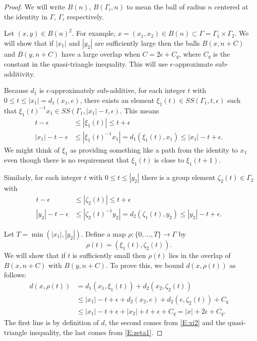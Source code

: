 \documentclass[12pt]{article}
\theoremstyle{plain}
\theoremstyle{definition}
\theoremstyle{remark}
\newcommand{\G}{\Gamma}
\newcommand{\eps}{\epsilon}
\begin{document}
\begin{proof}%
We will write $B(n)$, $B(\G_i,n)$ to mean the ball of radius $n$ centered at the identity in $\G$, $\G_i$ respectively. 

Let $(x,y) \in B(n)^2$. For example, $x=(x_1,x_2)\in B(n) \subset \G=\G_1\times \G_2$. We will show that if $|x_1|$ and $|y_2|$ are sufficiently large then the balls $B(x,n+C)$ and $B(y,n+C)$ have a large overlap when $C=2\eps+C_q$, where $C_q$ is the constant in the quasi-triangle inequality. This will use $\eps$-approximate sub-additivity. 


Because $d_1$ is $\eps$-approximately sub-additive, for each integer $t$ with $0\le t\le |x_1|=d_1(x_1,e)$, there exists an element $\xi_1(t) \in SS(\G_1,t,\eps)$ such that $\xi_1(t)^{-1}x_1 \in SS(\G_1,|x_1|-t,\eps)$. This means
\begin{align}
    t-\eps& \le |\xi_1(t)|\le t+\eps \label{E:xi1} \\
    |x_1|-t-\eps& \le |\xi_1(t)^{-1}x_1|=d_1(\xi_1(t),x_1)  \le |x_1|-t+\eps.\label{E:xi2} 
\end{align}
We might think of $\xi_1$ as providing something like a path from the identity to $x_1$ even though there is no requirement that $\xi_1(t)$ is close to $\xi_1(t+1)$. 

Similarly, for each integer $t$ with $0\le t \le |y_2|$ there is a group element $\zeta_2(t)\in \G_2$ with
\begin{align}
    t-\eps& \le |\zeta_2(t)|\le t+\eps \label{E:zeta1}\\
    |y_2|-t-\eps& \le |\zeta_2(t)^{-1}y_2|=d_2(\zeta_1(t),y_2)  \le |y_2|-t+\eps.\label{E:zeta2}
\end{align}




Let $T=\min(|x_1|,|y_2|)$. Define a map $\rho:\{0,\ldots, T\} \to \G$ by
$$\rho(t) = (\xi_1(t),\zeta_2(t)).$$
We will show that if $t$ is sufficiently small then $\rho(t)$ lies in the overlap of $B(x,n+C)$ with $B(y,n+C)$. To prove this, we bound $d(x,\rho(t))$ as follows:
\begin{align*}
  d(x,\rho(t))  &= d_1(x_1, \xi_1(t)) + d_2(x_2, \zeta_2(t))  \\
  &\le |x_1|-t+\eps + d_2(x_2, e) + d_2(e, \zeta_2(t)) + C_q \\
  &\le |x_1|-t+\eps + |x_2| + t + \eps + C_q = |x|  + 2\eps + C_q.
\end{align*}
The first line is by definition of $d$, the second comes from \eqref{E:xi2} and the quasi-triangle inequality, the last comes from \eqref{E:zeta1}.


\end{proof}
\end{document}
